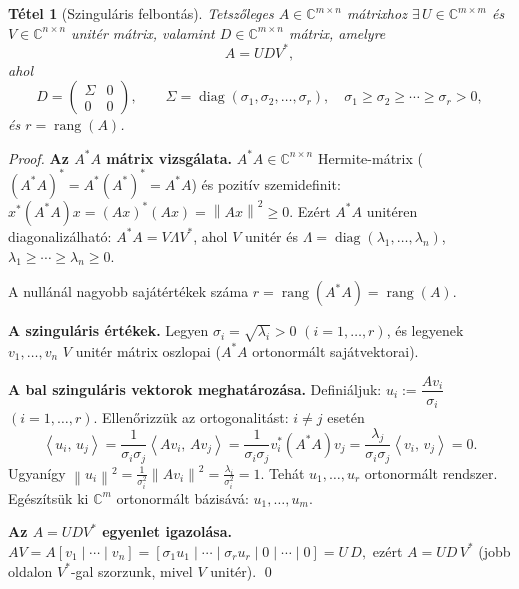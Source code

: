 \documentclass[a4paper,12pt]{article}
\theoremstyle{mydef}
\newtheorem{tetel}{Tétel}[section]
\newcommand{\C}{\mathbb{C}}
\newcommand{\norm}[1]{\left\|#1\right\|}
\newcommand{\innerprod}[2]{\left\langle #1,\,#2 \right\rangle}
\DeclareMathOperator{\rang}{rang}
\DeclareMathOperator{\diag}{diag}
\begin{document}
\begin{mdframed}[backgroundcolor=thmbg,linewidth=0pt,innertopmargin=8pt,innerbottommargin=8pt]
\begin{tetel}[Szinguláris felbontás]
\label{tetel:svd}
Tetszőleges $A \in \C^{m\times n}$ mátrixhoz $\exists\, U \in \C^{m\times m}$ és
$V \in \C^{n\times n}$ unitér mátrix, valamint $D \in \C^{m\times n}$ mátrix, amelyre
\[
  A = UDV^*,
\]
ahol
\[
  D = \begin{pmatrix} \Sigma & 0 \\ 0 & 0 \end{pmatrix}, \qquad
  \Sigma = \diag(\sigma_1, \sigma_2, \ldots, \sigma_r), \quad
  \sigma_1 \ge \sigma_2 \ge \cdots \ge \sigma_r > 0,
\]
és $r = \rang(A)$.
\end{tetel}
\end{mdframed}

\begin{proof}
\textbf{Az $A^*A$ mátrix vizsgálata.}
$A^*A \in \C^{n\times n}$ Hermite-mátrix ($(A^*A)^* = A^*(A^*)^* = A^*A$) és pozitív szemidefinit:
$x^*(A^*A)x = (Ax)^*(Ax) = \norm{Ax}^2 \ge 0$. Ezért $A^*A$ unitéren diagonalizálható:
$A^*A = V \Lambda V^*$, ahol $V$ unitér és $\Lambda = \diag(\lambda_1, \ldots, \lambda_n)$,
$\lambda_1 \ge \cdots \ge \lambda_n \ge 0$.

A nullánál nagyobb sajátértékek száma $r = \rang(A^*A) = \rang(A)$.

\textbf{A szinguláris értékek.}
Legyen $\sigma_i = \sqrt{\lambda_i} > 0$ $(i = 1, \ldots, r)$, és legyenek $v_1, \ldots, v_n$
$V$ unitér mátrix oszlopai ($A^*A$ ortonormált sajátvektorai).

\textbf{A bal szinguláris vektorok meghatározása.}
Definiáljuk: $u_i := \dfrac{Av_i}{\sigma_i}$ $(i = 1, \ldots, r)$. Ellenőrizzük az
ortogonalitást: $i \ne j$ esetén
\[
  \innerprod{u_i}{u_j} = \frac{1}{\sigma_i\sigma_j}\innerprod{Av_i}{Av_j}
  = \frac{1}{\sigma_i\sigma_j} v_i^*(A^*A)v_j
  = \frac{\lambda_j}{\sigma_i\sigma_j}\innerprod{v_i}{v_j} = 0.
\]
Ugyanígy $\norm{u_i}^2 = \tfrac{1}{\sigma_i^2}\norm{Av_i}^2 = \tfrac{\lambda_i}{\sigma_i^2} = 1$.
Tehát $u_1, \ldots, u_r$ ortonormált rendszer. Egészítsük ki $\C^m$ ortonormált bázisává:
$u_1, \ldots, u_m$.

\textbf{Az $A = UDV^*$ egyenlet igazolása.}
$AV = A[v_1 \mid \cdots \mid v_n] = [\sigma_1 u_1 \mid \cdots \mid \sigma_r u_r \mid 0 \mid \cdots \mid 0]
= U\,D,$
ezért $A = UD\,V^*$ (jobb oldalon $V^*$-gal szorzunk, mivel $V$ unitér). \qed
\end{proof}
\end{document}
